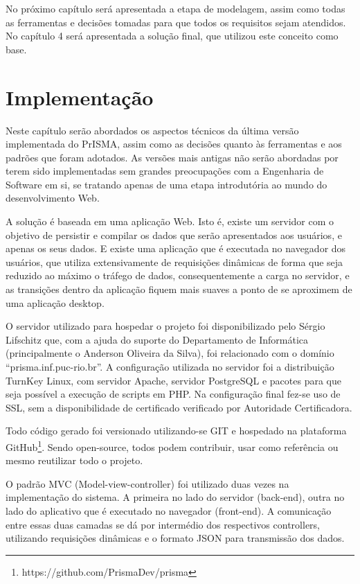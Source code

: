 \documentclass[graduacao,brazil]{ThesisPUC}
\begin{document}
No próximo capítulo será apresentada a etapa de modelagem, assim como todas as ferramentas e decisões tomadas para que todos os requisitos sejam atendidos. No capítulo 4 será apresentada a solução final, que utilizou este conceito como base.

\chapter{Implementação}

Neste capítulo serão abordados os aspectos técnicos da última versão implementada do PrISMA, assim como as decisões quanto às ferramentas e aos padrões que foram adotados. As versões mais antigas não serão abordadas por terem sido implementadas sem grandes preocupações com a Engenharia de Software em si, se tratando apenas de uma etapa introdutória ao mundo do desenvolvimento Web.

A solução é baseada em uma aplicação Web. Isto é, existe um servidor com o objetivo de persistir e compilar os dados que serão apresentados aos usuários, e apenas os seus dados. E existe uma aplicação que é executada no navegador dos usuários, que utiliza extensivamente de requisições dinâmicas de forma que seja reduzido ao máximo o tráfego de dados, consequentemente a carga no servidor, e as transições dentro da aplicação fiquem mais suaves a ponto de se aproximem de uma aplicação desktop.

O servidor utilizado para hospedar o projeto foi disponibilizado pelo Sérgio Lifschitz que, com a ajuda do suporte do Departamento de Informática (principalmente o Anderson Oliveira da Silva), foi relacionado com o domínio “prisma.inf.puc-rio.br”. A configuração utilizada no servidor foi a distribuição TurnKey Linux, com servidor Apache\cite{Apache}, servidor PostgreSQL\cite{PostgreSQL} e pacotes para que seja possível a execução de scripts em PHP\cite{PHP}. Na configuração final fez-se uso de SSL, sem a disponibilidade de certificado verificado por Autoridade Certificadora.

Todo código gerado foi versionado utilizando-se GIT e hospedado na plataforma GitHub\footnote{https://github.com/PrismaDev/prisma}. Sendo open-source, todos podem contribuir, usar como referência ou mesmo reutilizar todo o projeto.

O padrão MVC (Model-view-controller) foi utilizado duas vezes na implementação do sistema. A primeira no lado do servidor (back-end), outra no lado do aplicativo que é executado no navegador (front-end). A comunicação entre essas duas camadas se dá por intermédio dos respectivos controllers, utilizando requisições dinâmicas e o formato JSON para transmissão dos dados.
\end{document}
